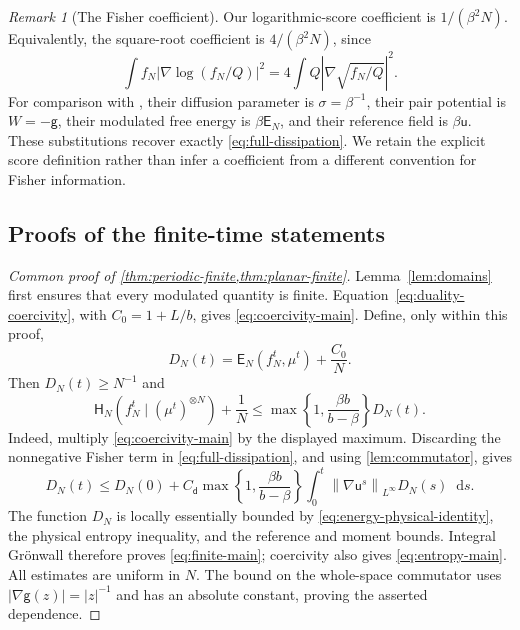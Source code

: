 \documentclass[11pt,reqno]{amsart}
\numberwithin{equation}{section}
\theoremstyle{definition}
\theoremstyle{remark}
\newtheorem{remark}[remark]{Remark}
\newcommand{\g}{\mathsf g}
\renewcommand{\d}{\mathsf d}
\newcommand{\Hr}{\mathsf H}
\newcommand{\Er}{\mathsf E}
\renewcommand{\u}{\mathsf u}
\newcommand{\dd}{\mathop{}\!\mathrm d}
\newcommand{\norm}[1]{\left\lVert#1\right\rVert}
\newcommand{\abs}[1]{\left\lvert#1\right\rvert}
\begin{document}
\begin{remark}[The Fisher coefficient]\label{rem:fisher-factor}
Our logarithmic-score coefficient is $1/(\beta^2N)$. Equivalently, the square-root coefficient is $4/(\beta^2N)$, since
\begin{equation}\label{eq:fisher-factor-four}
 \int f_N\abs{\nabla\log(f_N/Q)}^2
 =4\int Q\abs{\nabla\sqrt{f_N/Q}}^2.
\end{equation}
For comparison with \cite[Proposition~2.3]{BJW}, their diffusion parameter is $\sigma=\beta^{-1}$, their pair potential is $W=-\g$, their modulated free energy is $\beta \Er_N$, and their reference field is $\beta \u$. These substitutions recover exactly \eqref{eq:full-dissipation}. We retain the explicit score definition rather than infer a coefficient from a different convention for Fisher information.
\end{remark}

\subsection{Proofs of the finite-time statements}
\begin{proof}[Common proof of \cref{thm:periodic-finite,thm:planar-finite}]
Lemma~\ref{lem:domains} first ensures that every modulated quantity is finite. Equation~\eqref{eq:duality-coercivity}, with $C_0=1+L/b$, gives \eqref{eq:coercivity-main}. Define, only within this proof,
\begin{equation}\label{eq:shifted-energy}
 D_N(t)=\Er_N(f_N^t,\mu^t)+\frac{C_0}{N}.
\end{equation}
Then $D_N(t)\geq N^{-1}$ and
\begin{equation}\label{eq:entropy-to-shift}
 \Hr_N(f_N^t\mid(\mu^t)^{\otimes N})+\frac1N
 \leq\max\!\left\{1,\frac{\beta b}{b-\beta}\right\}D_N(t).
\end{equation}
Indeed, multiply \eqref{eq:coercivity-main} by the displayed maximum. Discarding the nonnegative Fisher term in \eqref{eq:full-dissipation}, and using \cref{lem:commutator}, gives
\begin{equation}\label{eq:integral-gronwall}
 D_N(t)\leq D_N(0)+C_\d\max\!\left\{1,\frac{\beta b}{b-\beta}\right\}
      \int_0^t\norm{\nabla \u^s}_{L^\infty}D_N(s)\dd s.
\end{equation}
The function $D_N$ is locally essentially bounded by \eqref{eq:energy-physical-identity}, the physical entropy inequality, and the reference and moment bounds. Integral Gr\"onwall therefore proves \eqref{eq:finite-main}; coercivity also gives \eqref{eq:entropy-main}. All estimates are uniform in $N$. The bound on the whole-space commutator uses $|\nabla\g(z)|=|z|^{-1}$ and has an absolute constant, proving the asserted dependence.
\end{proof}
\end{document}

